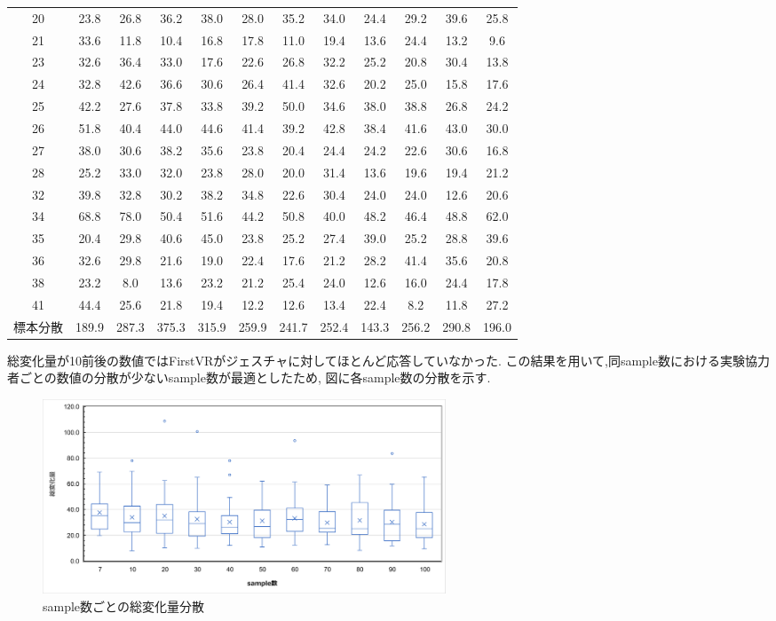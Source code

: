 \documentclass{ltjsreport}
\begin{document}
\begin{table}[H]
\begin{center}
\begin{tabular}{c|ccccccccccc}
			20 & 23.8 & 26.8 & 36.2 & 38.0 & 28.0 & 35.2 & 34.0 & 24.4 & 29.2 & 39.6 & 25.8 \\
			21 & 33.6 & 11.8 & 10.4 & 16.8 & 17.8 & 11.0 & 19.4 & 13.6 & 24.4 & 13.2 & 9.6 \\
			23 & 32.6 & 36.4 & 33.0 & 17.6 & 22.6 & 26.8 & 32.2 & 25.2 & 20.8 & 30.4 & 13.8 \\
			24 & 32.8 & 42.6 & 36.6 & 30.6 & 26.4 & 41.4 & 32.6 & 20.2 & 25.0 & 15.8 & 17.6 \\
			25 & 42.2 & 27.6 & 37.8 & 33.8 & 39.2 & 50.0 & 34.6 & 38.0 & 38.8 & 26.8 & 24.2 \\
			26 & 51.8 & 40.4 & 44.0 & 44.6 & 41.4 & 39.2 & 42.8 & 38.4 & 41.6 & 43.0 & 30.0 \\
			27 & 38.0 & 30.6 & 38.2 & 35.6 & 23.8 & 20.4 & 24.4 & 24.2 & 22.6 & 30.6 & 16.8 \\
			28 & 25.2 & 33.0 & 32.0 & 23.8 & 28.0 & 20.0 & 31.4 & 13.6 & 19.6 & 19.4 & 21.2 \\
			32 & 39.8 & 32.8 & 30.2 & 38.2 & 34.8 & 22.6 & 30.4 & 24.0 & 24.0 & 12.6 & 20.6 \\
			34 & 68.8 & 78.0 & 50.4 & 51.6 & 44.2 & 50.8 & 40.0 & 48.2 & 46.4 & 48.8 & 62.0 \\
			35 & 20.4 & 29.8 & 40.6 & 45.0 & 23.8 & 25.2 & 27.4 & 39.0 & 25.2 & 28.8 & 39.6 \\
			36 & 32.6 & 29.8 & 21.6 & 19.0 & 22.4 & 17.6 & 21.2 & 28.2 & 41.4 & 35.6 & 20.8 \\
			38 & 23.2 & 8.0 & 13.6 & 23.2 & 21.2 & 25.4 & 24.0 & 12.6 & 16.0 & 24.4 & 17.8 \\
			41 & 44.4 & 25.6 & 21.8 & 19.4 & 12.2 & 12.6 & 13.4 & 22.4 & 8.2 & 11.8 & 27.2 \\
			標本分散&189.9 & 287.3 & 375.3 & 315.9 & 259.9 & 241.7 & 252.4 & 143.3 & 256.2 & 290.8 & 196.0 \\
			\bottomrule
		\end{tabular}
		\end{center}
		\end{table}

		総変化量が10前後の数値ではFirstVRがジェスチャに対してほとんど応答していなかった.
		この結果を用いて,同sample数における実験協力者ごとの数値の分散が少ないsample数が最適としたため,
		図に各sample数の分散を示す.

		\begin{figure}[H]
		\centering
		\includegraphics[width = 12cm]{../figs/FVRALL.png}
		\caption{sample数ごとの総変化量分散}
		\label{fig:FVRdata}
		\end{figure}
\end{document}
